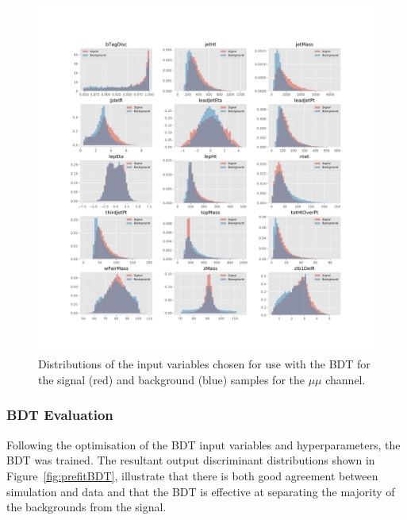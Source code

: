 \begin{figure}[htb]
\centering
\vspace*{-3.25cm}\hspace*{-2.3cm}\includegraphics[width=1.27\textwidth]{figs/background-estimation/plots/vars_mumu_corrected.pdf}
\vspace*{-1cm}\caption{
Distributions of the input variables chosen for use with the BDT for the signal (red) and background (blue) samples for the $\mu\mu$ channel.}
\label{fig:inputFeaturesDistributions_mumu}
\end{figure}

\clearpage
\newpage
\subsubsection*{BDT Evaluation}
Following the optimisation of the BDT input variables and hyperparameters, the BDT was trained.
The resultant output discriminant distributions shown in Figure~\ref{fig:prefitBDT}, illustrate that there is both good agreement between simulation and data and that the BDT is effective at separating the majority of the backgrounds from the signal.

